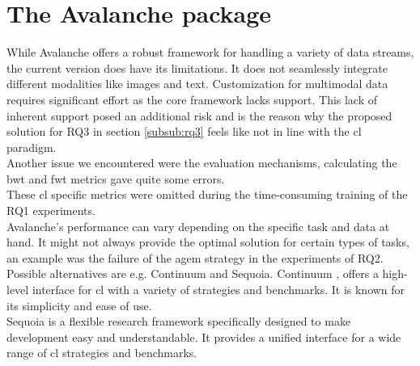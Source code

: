 \section{The Avalanche package}
While Avalanche \citep{lomonaco2021avalanche} offers a robust framework for handling a variety of data streams, the current version does have its limitations. It does not seamlessly integrate different modalities like images and text. Customization for multimodal data requires significant effort as the core framework lacks support. This lack of inherent support posed an additional risk and is the reason why the proposed solution for RQ3 in section \ref{subsub:rq3} feels like not in line with the \acrshort{cl} paradigm. \\
Another issue we encountered were the evaluation mechanisms, calculating the \acrshort{bwt} and \acrshort{fwt} metrics gave quite some errors.\\
These \acrshort{cl} specific metrics were omitted during the time-consuming training of the RQ1 experiments.\\
Avalanche's performance can vary depending on the specific task and data at hand. It might not always provide the optimal solution for certain types of tasks, an example was the failure of the \acrshort{agem} strategy in the experiments of RQ2.\\
Possible alternatives are e.g. Continuum and Sequoia. Continuum \citep{douillard2021continuum}, offers a high-level interface for \acrshort{cl} with a variety of strategies and benchmarks. It is known for its simplicity and ease of use.\\
Sequoia \citep{normandin2021sequoia} is a flexible research framework specifically designed to make development easy and understandable. It provides a unified interface for a wide range of \acrshort{cl} strategies and benchmarks. 


